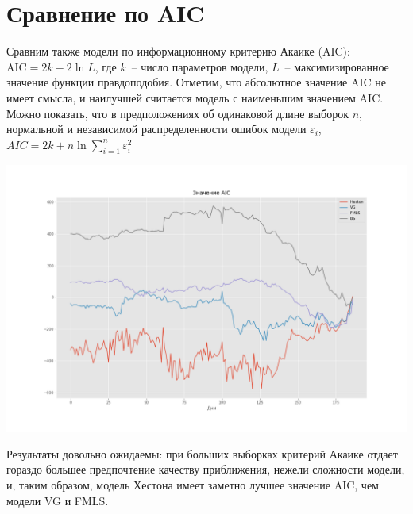 \documentclass[oneside, final, 12pt, a4paper]{article}
\begin{document}
\section{Сравнение по AIC}
Сравним также модели по информационному критерию Акаике (AIC)\cite{AIC:paper}: \( \text{AIC} = 2k - 2\ln{L} \), где $k$~-- число параметров модели,  $L$~-- максимизированное значение функции правдоподобия. Отметим, что абсолютное значение AIC не имеет смысла, и наилучшей считается модель с наименьшим значением AIC. Можно показать, что в предположениях об одинаковой длине выборок $n$, нормальной и независимой распределенности ошибок модели $\varepsilon_i$, \( AIC = 2k +  n\ln{\sum\limits_{i = 1}^n}{\varepsilon_i^2}\)
\begin{center}
  \includegraphics[width=1\linewidth]{img/AIC_187.png}
\end{center}

Результаты довольно ожидаемы: при больших выборках критерий Акаике отдает гораздо большее предпочтение качеству приближения, нежели сложности модели, и, таким образом, модель Хестона имеет заметно лучшее значение AIC, чем модели VG и FMLS.


\newpage
\end{document}
